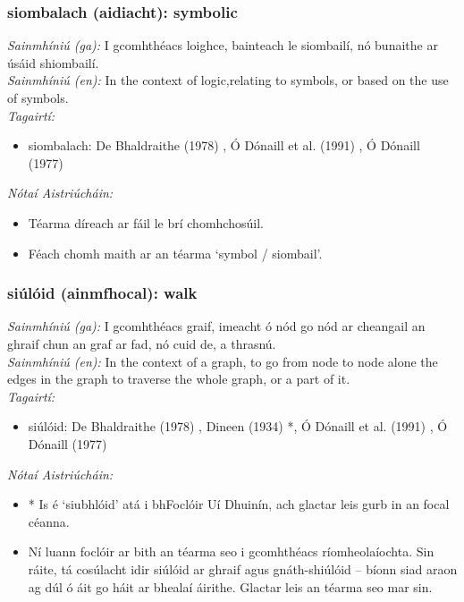 \subsubsection*{siombalach (aidiacht): symbolic}
 \noindent \textit{Sainmhíniú (ga):} I gcomhthéacs loighce, bainteach le siombailí, nó bunaithe ar úsáid shiombailí.
\\
 \noindent \textit{Sainmhíniú (en):} In the context of logic,relating to symbols, or based on the use of symbols.
\\
 \noindent \textit{Tagairtí:}
\begin{itemize}
	\item siombalach: De Bhaldraithe (1978) \cite{de-bhaldraithe}, Ó Dónaill et al. (1991) \cite{focloir-beag}, Ó Dónaill (1977) \cite{odonaill}
\end{itemize}

 \noindent \textit{Nótaí Aistriúcháin:}
\begin{itemize}
	\item Téarma díreach ar fáil le brí chomhchosúil.
	\item Féach chomh maith ar an téarma `symbol / siombail'.
\end{itemize}


\subsubsection*{siúlóid (ainmfhocal): walk}
 \noindent \textit{Sainmhíniú (ga):} I gcomhthéacs graif, imeacht ó nód go nód ar cheangail an ghraif chun an graf ar fad, nó cuid de, a thrasnú.
\\
 \noindent \textit{Sainmhíniú (en):} In the context of a graph, to go from node to node alone the edges in the graph to traverse the whole graph, or a part of it.
\\
 \noindent \textit{Tagairtí:}
\begin{itemize}
	\item siúlóid: De Bhaldraithe (1978) \cite{de-bhaldraithe}, Dineen (1934) \cite{dineen}*, Ó Dónaill et al. (1991) \cite{focloir-beag}, Ó Dónaill (1977) \cite{odonaill}
\end{itemize}

 \noindent \textit{Nótaí Aistriúcháin:}
\begin{itemize}
	\item * Is é `siubhlóid' atá i bhFoclóir Uí Dhuinín, ach glactar leis gurb in an focal céanna.
	\item Ní luann foclóir ar bith an téarma seo i gcomhthéacs ríomheolaíochta. Sin ráite, tá cosúlacht idir siúlóid ar ghraif agus gnáth-shiúlóid -- bíonn siad araon ag dúl ó áit go háit ar bhealaí áirithe. Glactar leis an téarma seo mar sin.
\end{itemize}


